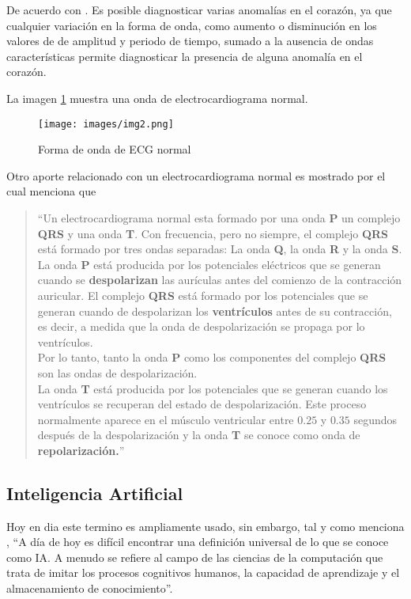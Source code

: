De acuerdo con \citet[p. 365]{bib11}. Es posible diagnosticar varias anomalías en el corazón, ya que cualquier variación en la forma de onda, como aumento o disminución en los valores de de amplitud y periodo de tiempo, sumado a la ausencia de ondas características permite diagnosticar la presencia de alguna anomalía en el corazón.

La imagen \ref{fig:ecg_normal} muestra una onda de electrocardiograma normal.

    \begin{figure}[!ht]
        \centering
        \texttt{[image: images/img2.png]}
        \caption{Forma de onda de ECG normal \citep{bib11}}
        \label{fig:ecg_normal}
    \end{figure}

Otro aporte relacionado con un electrocardiograma normal es mostrado por \citet[p. 38]{bib13} el cual menciona que 
\begin{quote}
    ``Un electrocardiograma normal esta formado por una onda \textbf{P} un complejo \textbf{QRS} y una onda \textbf{T}. Con frecuencia, pero no siempre, el complejo \textbf{QRS} está formado por tres ondas separadas: La onda \textbf{Q}, la onda \textbf{R} y la onda \textbf{S}.\\
    La onda \textbf{P} está producida por los potenciales eléctricos que se generan cuando se \textbf{despolarizan} las aurículas antes del comienzo de la contracción auricular. El complejo \textbf{QRS} está formado por los potenciales que se generan cuando de despolarizan los \textbf{ventrículos} antes de su contracción, es decir, a medida que la onda de despolarización se propaga por lo ventrículos.\\
    Por lo tanto, tanto la onda \textbf{P} como los componentes del complejo \textbf{QRS} son las ondas de despolarización.\\
    La onda \textbf{T} está producida por los potenciales que se generan cuando los ventrículos se recuperan del estado de despolarización. Este proceso normalmente aparece en el músculo ventricular entre $0.25$ y $0.35$ segundos después de la despolarización y la onda \textbf{T} se conoce como onda de \textbf{repolarización.}''
\end{quote}

    \subsection{Inteligencia Artificial}
    Hoy en dia este termino es ampliamente usado, sin embargo, tal y como menciona \citet[p. 1066]{bib4}, ``A día de hoy es difícil encontrar una definición universal de lo que se conoce como IA. A menudo se refiere al campo de las ciencias de la computación que trata de imitar los procesos cognitivos humanos, la capacidad de aprendizaje y el almacenamiento de conocimiento''.

